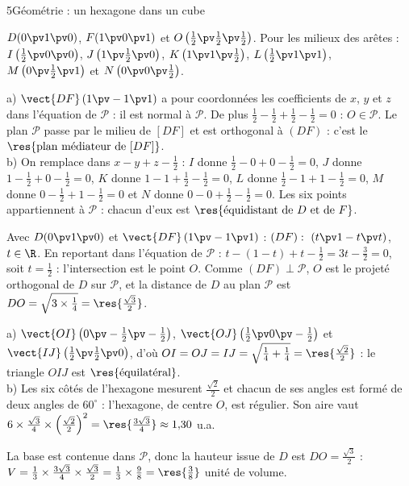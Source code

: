 \begin{corrigeBac}{5}{Géométrie : un hexagone dans un cube}
\begin{questions}
  \item $D(0\pv1\pv0)$, $F(1\pv0\pv1)$ et $O\left(\frac12\pv\frac12\pv\frac12\right)$. Pour les milieux des arêtes :
    $I\left(\frac12\pv0\pv0\right)$, $J\left(1\pv\frac12\pv0\right)$, $K\left(1\pv1\pv\frac12\right)$, $L\left(\frac12\pv1\pv1\right)$,
    $M\left(0\pv\frac12\pv1\right)$ et $N\left(0\pv0\pv\frac12\right)$. 
  \item a) $\vect{DF}\,(1\pv-1\pv1)$ a pour coordonnées les coefficients de $x$, $y$ et $z$ dans l'équation de $\mathcal{P}$ : il est normal
    à $\mathcal{P}$. De plus $\frac12-\frac12+\frac12-\frac12=0$ : $O\in\mathcal{P}$. Le plan $\mathcal{P}$ passe par le milieu de $[DF]$ et
    est orthogonal à $(DF)$ : c'est le $\res{\text{plan médiateur de }[DF]}$.\\
    b) On remplace dans $x-y+z-\frac12$ : $I$ donne $\frac12-0+0-\frac12=0$, $J$ donne $1-\frac12+0-\frac12=0$, $K$ donne
    $1-1+\frac12-\frac12=0$, $L$ donne $\frac12-1+1-\frac12=0$, $M$ donne $0-\frac12+1-\frac12=0$ et $N$ donne $0-0+\frac12-\frac12=0$. Les
    six points appartiennent à $\mathcal{P}$ : chacun d'eux est $\res{\text{équidistant de }D\text{ et de }F}$. 
  \item Avec $D(0\pv1\pv0)$ et $\vect{DF}\,(1\pv-1\pv1)$ : $(DF):\ (t\pv1-t\pv t)$, $t\in\R$. En reportant dans l'équation de $\mathcal{P}$ :
    $t-(1-t)+t-\frac12=3t-\frac32=0$, soit $t=\frac12$ : l'intersection est le point $O$. Comme $(DF)\perp\mathcal{P}$, $O$ est le projeté
    orthogonal de $D$ sur $\mathcal{P}$, et la distance de $D$ au plan $\mathcal{P}$ est $DO=\sqrt{3\times\frac14}=\res{\tfrac{\sqrt3}{2}}$. \pts{1 pt}
  \item a) $\vect{OI}\left(0\pv-\frac12\pv-\frac12\right)$, $\vect{OJ}\left(\frac12\pv0\pv-\frac12\right)$ et $\vect{IJ}\left(\frac12\pv\frac12\pv0\right)$,
    d'où $OI=OJ=IJ=\sqrt{\frac14+\frac14}=\res{\tfrac{\sqrt2}{2}}$ : le triangle $OIJ$ est $\res{\text{équilatéral}}$.\\
    b) Les six côtés de l'hexagone mesurent $\frac{\sqrt2}{2}$ et chacun de ses angles est formé de deux angles de $60^\circ$ : l'hexagone,
    de centre $O$, est régulier. Son aire vaut $6\times\frac{\sqrt3}{4}\times\left(\frac{\sqrt2}{2}\right)^{2}=\res{\tfrac{3\sqrt3}{4}}\approx1{,}30$ u.a. 
  \item La base est contenue dans $\mathcal{P}$, donc la hauteur issue de $D$ est $DO=\frac{\sqrt3}{2}$ :
    $V=\frac13\times\frac{3\sqrt3}{4}\times\frac{\sqrt3}{2}=\frac13\times\frac98=\res{\tfrac38}$ unité de volume. 
\end{questions}
\end{corrigeBac}

